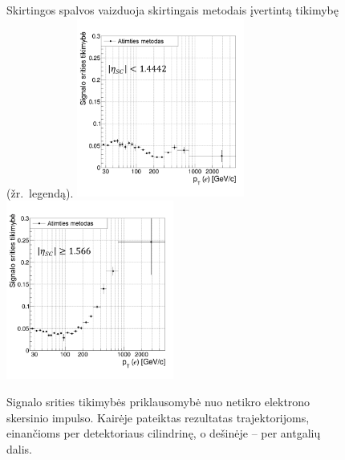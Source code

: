 \documentclass[a4paper, 12pt, oneside]{article}
\begin{document}
\begin{figure}[t!]
{		Skirtingos spalvos vaizduoja skirtingais metodais įvertintą tikimybę (žr.\ legendą).}
	\vspace{1cm}
	\includegraphics[width=0.49\textwidth]{Magistrinis/FRe_barrel.png}
	\includegraphics[width=0.49\textwidth]{Magistrinis/FRe_endcap.png}
	\caption{\label{fig:FRe}
		Signalo srities tikimybės priklausomybė nuo netikro elektrono skersinio impulso.
		Kairėje pateiktas rezultatas trajektorijoms, einančioms per detektoriaus cilindrinę, o dešinėje -- per antgalių dalis.}
\end{figure}
\end{document}

